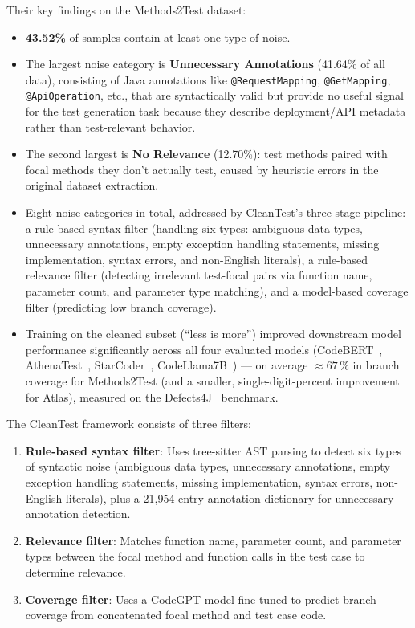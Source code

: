 \documentclass[acmlarge,nonacm,screen]{acmart}
\begin{document}
Their key findings on the Methods2Test dataset:
\begin{itemize}
    \item \textbf{43.52\%} of samples contain at least one type of noise.
    \item The largest noise category is \textbf{Unnecessary Annotations} (41.64\% of all data), consisting of Java annotations like \texttt{@RequestMapping}, \texttt{@GetMapping}, \texttt{@ApiOperation}, etc., that are syntactically valid but provide no useful signal for the test generation task because they describe deployment/API metadata rather than test-relevant behavior.
    \item The second largest is \textbf{No Relevance} (12.70\%): test methods paired with focal methods they don't actually test, caused by heuristic errors in the original dataset extraction.
    \item Eight noise categories in total, addressed by CleanTest's three-stage pipeline: a rule-based syntax filter (handling six types: ambiguous data types, unnecessary annotations, empty exception handling statements, missing implementation, syntax errors, and non-English literals), a rule-based relevance filter (detecting irrelevant test-focal pairs via function name, parameter count, and parameter type matching), and a model-based coverage filter (predicting low branch coverage).
    \item Training on the cleaned subset (``less is more'') improved downstream model performance significantly across all four evaluated models (CodeBERT~\cite{feng2020codebert}, AthenaTest~\cite{tufano2022athenatest}, StarCoder~\cite{li2023starcoder}, CodeLlama7B~\cite{roziere2023code}) --- on average $\approx 67\,\%$ in branch coverage for Methods2Test (and a smaller, single-digit-percent improvement for Atlas), measured on the Defects4J~\cite{just2014defects4j} benchmark.
\end{itemize}

The CleanTest framework consists of three filters:
\begin{enumerate}
    \item \textbf{Rule-based syntax filter}: Uses tree-sitter AST parsing to detect six types of syntactic noise (ambiguous data types, unnecessary annotations, empty exception handling statements, missing implementation, syntax errors, non-English literals), plus a 21,954-entry annotation dictionary for unnecessary annotation detection.
    \item \textbf{Relevance filter}: Matches function name, parameter count, and parameter types between the focal method and function calls in the test case to determine relevance.
    \item \textbf{Coverage filter}: Uses a CodeGPT model fine-tuned to predict branch coverage from concatenated focal method and test case code.
\end{enumerate}
\end{document}
